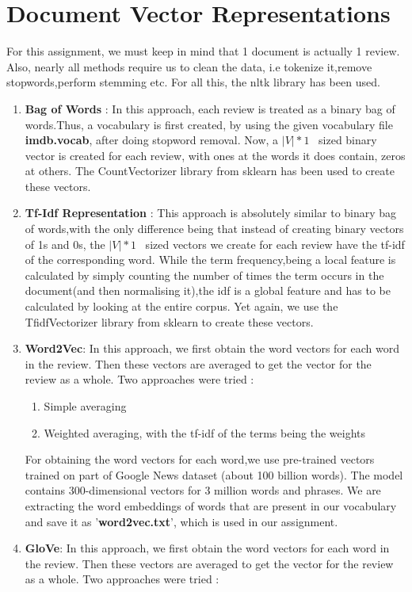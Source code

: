 \documentclass{article}
\begin{document}
\section{Document Vector Representations}
For this assignment, we must keep in mind that 1 document is actually 1 review. Also, nearly all methods require us to clean the data, i.e tokenize it,remove stopwords,perform stemming etc. For all this, the nltk library has been used.
\begin{enumerate}
    \item \textbf{Bag of Words} : In this approach, each review is treated as a binary bag of words.Thus, a vocabulary is first created, by using the given vocabulary file \textbf{imdb.vocab}, after doing stopword removal. Now, a $|V| * 1$ \ sized  binary vector is created for each review, with ones at the words it does contain, zeros at others. The CountVectorizer library from sklearn has been used to create these vectors.  
    \item \textbf{Tf-Idf Representation} : This approach is absolutely similar to binary bag of words,with the only difference being that instead of creating binary vectors of 1s and 0s, the $|V| * 1$ \ sized vectors we create for each review have  the tf-idf of the corresponding word. While the term frequency,being a local feature is calculated by simply counting the number of times the term occurs in the document(and then normalising it),the idf is a global feature and has to be calculated by looking at the entire corpus. Yet again, we use the TfidfVectorizer library from sklearn to create these  vectors.
    \item \textbf{Word2Vec}: In this approach, we first obtain the word vectors for each word in the review. Then these vectors are averaged to get the vector for the review as a whole. Two approaches were tried :
    \begin{enumerate}
        \item Simple averaging
        \item Weighted averaging, with the tf-idf of the terms being the weights
    \end{enumerate}
    For obtaining the word vectors for each word,we use pre-trained vectors trained on part of Google News dataset (about 100 billion words). The model contains 300-dimensional vectors for 3 million words and phrases. We are extracting the word embeddings of words that are present in our vocabulary and save it as '\textbf{word2vec.txt}', which is used in our assignment. 
    \item \textbf{GloVe}: In this approach, we first obtain the word vectors for each word in the review. Then these vectors are averaged to get the vector for the review as a whole. Two approaches were tried :

\end{enumerate}
\end{document}
